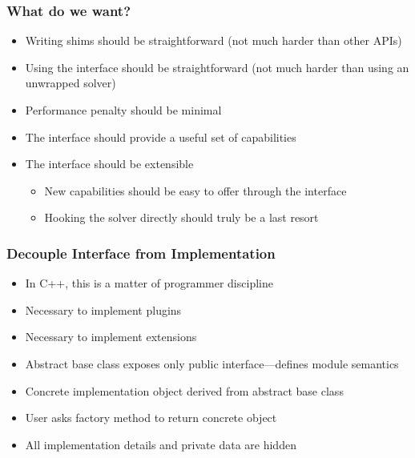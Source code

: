 \documentclass{beamer}
\begin{document}
\begin{frame}
  \frametitle{What do we want?}

  \begin{itemize}
  \item Writing shims should be straightforward (not much harder than
    other APIs)
  \item Using the interface should be straightforward (not much harder
    than using an unwrapped solver)
  \item Performance penalty should be minimal
  \item The interface should provide a useful set of capabilities
  \item The interface should be extensible
    \begin{itemize}
    \item New capabilities should be easy to offer through the interface
    \item Hooking the solver directly should truly be a last resort
    \end{itemize}
  \end{itemize}
\end{frame}

\begin{frame}
  \frametitle{Decouple Interface from Implementation}

  \begin{itemize}
  \item In C++, this is a matter of programmer discipline
  \item Necessary to implement plugins
  \item Necessary to implement extensions
  \end{itemize}
  \pause
  \begin{itemize}
  \item Abstract base class exposes only public interface---defines
    module semantics
  \item Concrete implementation object derived from abstract base class
  \item User asks factory method to return concrete object
  \item All implementation details and private data are hidden
  \end{itemize}
\end{frame}
\end{document}
